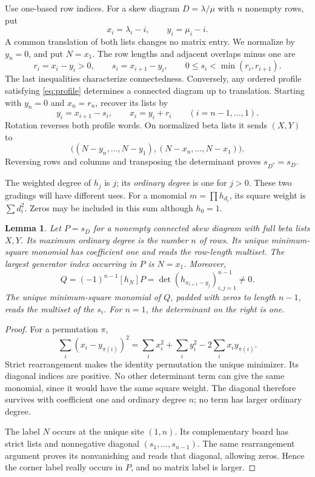 \documentclass[11pt,a4paper]{amsart}
\numberwithin{equation}{section}
\theoremstyle{plain}
\newtheorem{lemma}[theorem]{Lemma}
\theoremstyle{definition}
\begin{document}
Use one-based row indices.  For a skew diagram \(D=\lambda/\mu\) with
\(n\) nonempty rows, put
\[
 x_i=\lambda_i-i,\qquad y_i=\mu_i-i.
\]
A common translation of both lists changes no matrix entry.  We normalize by
\(y_n=0\), and put \(N=x_1\).  The row lengths and adjacent overlaps minus
one are
\begin{equation}\label{eq:profile}
 r_i=x_i-y_i>0,\qquad
 s_i=x_{i+1}-y_i,\qquad
 0\le s_i<\min(r_i,r_{i+1}).
\end{equation}
The last inequalities characterize connectedness.  Conversely, any ordered
profile satisfying \eqref{eq:profile} determines a connected diagram up to
translation.  Starting with \(y_n=0\) and \(x_n=r_n\), recover its lists by
\[
 y_i=x_{i+1}-s_i,\qquad x_i=y_i+r_i
 \qquad(i=n-1,\ldots,1).
\]
Rotation reverses both profile words.  On normalized beta lists it sends
\((X,Y)\) to
\[
 \bigl((N-y_n,\ldots,N-y_1),
       (N-x_n,\ldots,N-x_1)\bigr).
\]
Reversing rows and columns and transposing the determinant proves
\(s_{D^*}=s_D\).

The weighted degree of \(h_j\) is \(j\); its \emph{ordinary degree} is one
for \(j>0\).  These two gradings will have different uses.  For a monomial
\(m=\prod h_{d_i}\), its square weight is \(\sum d_i^2\).
Zeros may be included in this sum although \(h_0=1\).

\begin{lemma}\label{lem:polynomial-readings}
Let \(P=s_D\) for a nonempty connected skew diagram with full beta lists
\(X,Y\).  Its maximum ordinary degree is the number \(n\) of rows.  Its
unique minimum-square monomial has coefficient one and reads the row-length
multiset.  The largest generator index occurring in \(P\) is \(N=x_1\).
Moreover,
\begin{equation}\label{eq:corner-coefficient}
 Q=(-1)^{n-1}[h_N]P
   =\det(h_{x_{i+1}-y_j})_{i,j=1}^{n-1}\ne0.
\end{equation}
The unique minimum-square monomial of \(Q\), padded with zeros to length
\(n-1\), reads the multiset of the \(s_i\).
For \(n=1\), the determinant on the right is one.
\end{lemma}

\begin{proof}
For a permutation \(\pi\),
\[
 \sum_i(x_i-y_{\pi(i)})^2
 =\sum_i x_i^2+\sum_i y_i^2-2\sum_i x_i y_{\pi(i)}.
\]
Strict rearrangement makes the identity permutation the unique minimizer.
Its diagonal indices are positive.  No other determinant term can give the
same monomial, since it would have the same square weight.  The diagonal
therefore survives with coefficient one and ordinary degree \(n\); no term
has larger ordinary degree.

The label \(N\) occurs at the unique site \((1,n)\).  Its complementary
board has strict lists and nonnegative diagonal \((s_1,\ldots,s_{n-1})\).
The same rearrangement argument proves its nonvanishing and reads that
diagonal, allowing zeros.  Hence the corner label really occurs in \(P\),
and no matrix label is larger.
\end{proof}
\end{document}
